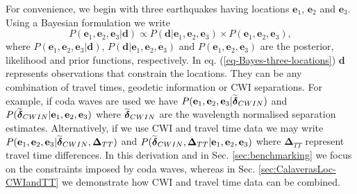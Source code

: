 \documentclass[extra]{gji}
\begin{document}
For convenience, we begin with three earthquakes having locations
$\mathbf{e}_1$, $\mathbf{e}_2$ and $\mathbf{e}_3$. Using a Bayesian
formulation we write
\begin{equation}
\label{eq-Bayes-three-locations}
P(\mathbf{e}_1, \mathbf{e}_2, \mathbf{e}_3| \mathbf{d}) \propto P( \mathbf{d}|\mathbf{e}_1, \mathbf{e}_2, \mathbf{e}_3)
\times P(\mathbf{e}_1, \mathbf{e}_2, \mathbf{e}_3),
\end{equation}
where $P(\mathbf{e}_1, \mathbf{e}_2, \mathbf{e}_3 | \mathbf{d})$,
$P(\mathbf{d}|\mathbf{e}_1, \mathbf{e}_2, \mathbf{e}_3)$ and
$P(\mathbf{e}_1, \mathbf{e}_2, \mathbf{e}_3)$ are the posterior,
likelihood and prior functions, respectively. In eq.
(\ref{eq-Bayes-three-locations}) $\mathbf{d}$ represents
observations that constrain the locations. They can be any
combination of travel times, geodetic information  or CWI
separations. For example, if coda waves are used we have
$P(\mathbf{e}_1, \mathbf{e}_2, \mathbf{e}_3 |
\widetilde{\mitbf{\delta}}_{CWIN})$ and
$P(\widetilde{\mitbf{\delta}}_{CWIN}|\mathbf{e}_1, \mathbf{e}_2,
\mathbf{e}_3)$ where $\widetilde{\mitbf{\delta}}_{CWIN}$ are the
wavelength normalised separation estimates. Alternatively, if we use
CWI and travel time data we may write $P(\mathbf{e}_1, \mathbf{e}_2,
\mathbf{e}_3 | \widetilde{\mitbf{\delta}}_{CWIN},
\mathbf{\Delta}_{TT})$ and
$P(\widetilde{\mitbf{\delta}}_{CWIN},\mathbf{\Delta}_{TT}|\mathbf{e}_1,
\mathbf{e}_2, \mathbf{e}_3)$ where $\mathbf{\Delta}_{TT}$ represent
travel time differences. In this derivation and in Sec.
\ref{sec:benchmarking} we focus on the constraints imposed by coda
waves, whereas in Sec. \ref{sec:CalaverasLoc-CWIandTT} we
demonstrate how CWI and travel time data can be combined.
\end{document}
